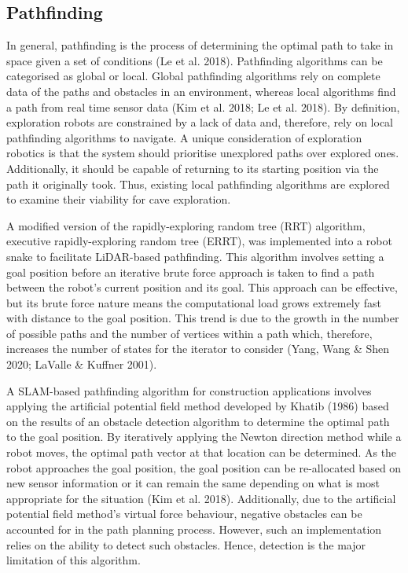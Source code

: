 \subsection{Pathfinding}
In general, pathfinding is the process of determining the optimal path to take in space given a set of conditions (Le et al. 2018). Pathfinding algorithms can be categorised as global or local. Global pathfinding algorithms rely on complete data of the paths and obstacles in an environment, whereas local algorithms find a path from real time sensor data (Kim et al. 2018; Le et al. 2018). By definition, exploration robots are constrained by a lack of data and, therefore, rely on local pathfinding algorithms to navigate. A unique consideration of exploration robotics is that the system should prioritise unexplored paths over explored ones. Additionally, it should be capable of returning to its starting position via the path it originally took. Thus, existing local pathfinding algorithms are explored to examine their viability for cave exploration.

A modified version of the rapidly-exploring random tree (RRT) algorithm, executive rapidly-exploring random tree (ERRT), was implemented into a robot snake to facilitate LiDAR-based pathfinding. This algorithm involves setting a goal position before an iterative brute force approach is taken to find a path between the robot's current position and its goal. This approach can be effective, but its brute force nature means the computational load grows extremely fast with distance to the goal position. This trend is due to the growth in the number of possible paths and the number of vertices within a path which, therefore, increases the number of states for the iterator to consider (Yang, Wang \& Shen 2020; LaValle \& Kuffner 2001). 

A SLAM-based pathfinding algorithm for construction applications involves applying the artificial potential field method developed by Khatib (1986) based on the results of an obstacle detection algorithm to determine the optimal path to the goal position. By iteratively applying the Newton direction method while a robot moves, the optimal path vector at that location can be determined. As the robot approaches the goal position, the goal position can be re-allocated based on new sensor information or it can remain the same depending on what is most appropriate for the situation (Kim et al. 2018). Additionally, due to the artificial potential field method's virtual force behaviour, negative obstacles can be accounted for in the path planning process. However, such an implementation relies on the ability to detect such obstacles. Hence, detection is the major limitation of this algorithm.


